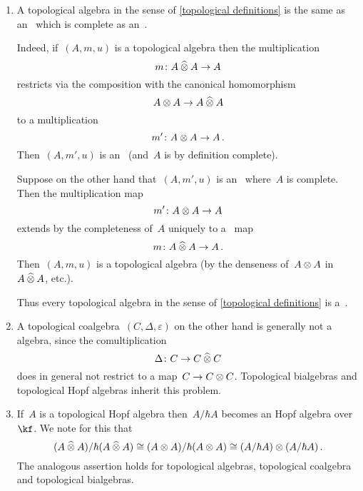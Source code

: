 \documentclass[a4paper, 11pt, oneside]{scrartcl}
\begin{document}
\begin{remark}
  \leavevmode
  \begin{enumerate}
    \item 
      A topological algebra in the sense of \cref{topological definitions} is the same as an~\algebra{$\kfhbar$} which is complete as an~\module{$\kfhbar$}.

      Indeed, if~$(A, m, u)$ is a topological algebra then the multiplication
      \[
        m \colon A \mathbin{\widehat{\otimes}} A \to A
      \]
      restricts via the composition with the canonical homomorphism
      \[
        A \otimes A
        \to
        A \mathbin{\widehat{\otimes}} A
      \]
      to a multiplication
      \[
        m'
        \colon
        A \otimes A
        \to
        A \,.
      \]
      Then~$(A, m', u)$ is an~\algebra{$\kfhbar$} (and~$A$ is by definition complete).

      Suppose on the other hand that~$(A, m', u)$ is an~\algebra{$\kfhbar$} where~$A$ is complete.
      Then the multiplication map
      \[
        m'
        \colon
        A \otimes A
        \to
        A
      \]
      extends by the completeness of~$A$ uniquely to a~\linear{$\kfhbar$} map
      \[
        m
        \colon
        A \mathbin{\widehat{\otimes}} A
        \to
        A \,.
      \]
      Then~$(A, m, u)$ is a topological algebra (by the denseness of~$A \otimes A$ in~$A \mathbin{\widehat{\otimes}} A$, etc.).

      Thus every topological algebra in the sense of \cref{topological definitions} is a~\algebra{$\kfhbar$}.
    \item
      A topological coalgebra~$(C, \Delta, \varepsilon)$ on the other hand is generally not a~\coalgebra{$\kfhbar$} algebra, since the comultiplication
      \[
        \Delta
        \colon
        C
        \to
        C \mathbin{\widehat{\otimes}} C
      \]
      does in general not restrict to a map~$C \to C \otimes C$.
      Topological bialgebras and topological Hopf algebras inherit this problem.
    \item
      If~$A$ is a topological Hopf algebra then~$A / \hbar A$ becomes an Hopf algebra over~$\kf$.
      We note for this that
      \[
        (A \mathbin{\widehat{\otimes}} A) / \hbar (A \mathbin{\widehat{\otimes}} A)
        \cong
        (A \otimes A) / \hbar (A \otimes A)
        \cong
        (A / \hbar A) \otimes (A / \hbar A) \,.
      \]
      The analogous assertion holds for topological algebras, topological coalgebra and topological bialgebras.
  \end{enumerate}
\end{remark}
\end{document}

